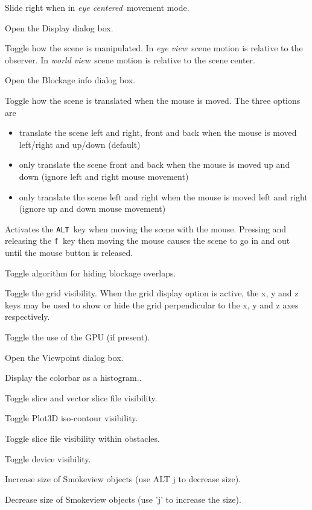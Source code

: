 \documentclass[11pt,twoside]{book}
\newcommand{\kitem}[1]{\item[{\bf {\tt #1 \  }} \hfill]}
\begin{document}
\kitem{D}Slide right when in {\em eye centered}\ movement mode.

\kitem{ALT d, D}Open the Display dialog box.

\kitem{e}Toggle how the scene is manipulated.  In {\em eye
view}\ scene motion is relative to the observer.  In {\em world
view}\ scene motion is relative to the scene center.

\kitem{ALT e}Open the Blockage info dialog box.

\kitem{E}Toggle how the scene is translated when the mouse is moved.
The three options are
\begin{itemize}
\item translate the scene left and right, front and back when the mouse is moved left/right and up/down (default)
\item only translate the scene front and back when the mouse is moved up and down (ignore left and right mouse movement)
\item only translate the scene left and right when the mouse is moved left and right (ignore up and down mouse movement)
\end{itemize}

\kitem{f}Activates the {\tt ALT}\ key when moving the scene with the mouse.
Pressing and releasing the {\tt f}\ key then moving the mouse causes the scene to go in and out until the
mouse button is released.

\kitem{F}Toggle algorithm for hiding blockage overlaps.

\kitem{g}Toggle the grid visibility.  When the grid display option
is active, the x, y and z keys may be used to show or hide the
grid perpendicular to the x, y and z axes respectively.

\kitem{G}Toggle the use of the GPU (if present).

\kitem{ALT g}Open the Viewpoint dialog box.

\kitem{h}Display the colorbar as a histogram..

\kitem{H}Toggle slice and vector slice file  visibility.

\kitem{i}Toggle Plot3D iso-contour visibility.

\kitem{I}Toggle slice file visibility within obstacles.

\kitem{ALT i}Toggle device visibility.

\kitem{j,J}Increase size of Smokeview objects (use ALT j to decrease size).

\kitem{ALT j}Decrease size of Smokeview objects (use 'j' to increase the size).
\end{document}
